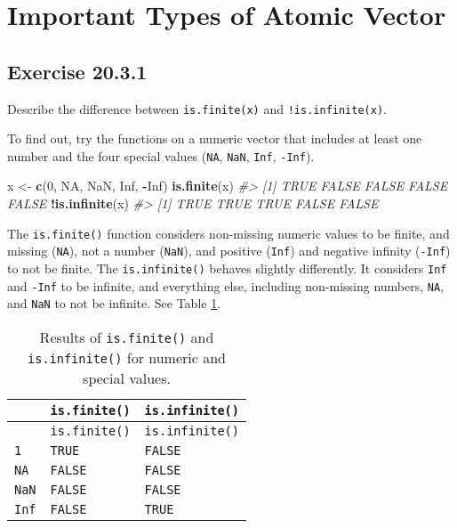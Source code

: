\documentclass[]{book}
\newenvironment{Shaded}{\begin{snugshade}}{\end{snugshade}}
\newcommand{\CommentTok}[1]{\textcolor[rgb]{0.56,0.35,0.01}{\textit{#1}}}
\newcommand{\DecValTok}[1]{\textcolor[rgb]{0.00,0.00,0.81}{#1}}
\newcommand{\KeywordTok}[1]{\textcolor[rgb]{0.13,0.29,0.53}{\textbf{#1}}}
\newcommand{\NormalTok}[1]{#1}
\newcommand{\OperatorTok}[1]{\textcolor[rgb]{0.81,0.36,0.00}{\textbf{#1}}}
\newcommand{\OtherTok}[1]{\textcolor[rgb]{0.56,0.35,0.01}{#1}}
\newcommand{\StringTok}[1]{\textcolor[rgb]{0.31,0.60,0.02}{#1}}
\theoremstyle{plain}
\theoremstyle{remark}
\begin{document}
\hypertarget{important-types-of-atomic-vector}{%
\section{Important Types of Atomic
Vector}\label{important-types-of-atomic-vector}}

\hypertarget{exercise-20.3.1}{%
\subsection*{\texorpdfstring{Exercise
{20.3.1}}{Exercise 20.3.1}}\label{exercise-20.3.1}}

Describe the difference between \texttt{is.finite(x)} and
\texttt{!is.infinite(x)}.

To find out, try the functions on a numeric vector that includes at
least one number and the four special values (\texttt{NA}, \texttt{NaN},
\texttt{Inf}, \texttt{-Inf}).

\begin{Shaded}
\begin{Highlighting}[]
\NormalTok{x <-}\StringTok{ }\KeywordTok{c}\NormalTok{(}\DecValTok{0}\NormalTok{, }\OtherTok{NA}\NormalTok{, }\OtherTok{NaN}\NormalTok{, }\OtherTok{Inf}\NormalTok{, }\OperatorTok{-}\OtherTok{Inf}\NormalTok{)}
\KeywordTok{is.finite}\NormalTok{(x)}
\CommentTok{#> [1]  TRUE FALSE FALSE FALSE FALSE}
\OperatorTok{!}\KeywordTok{is.infinite}\NormalTok{(x)}
\CommentTok{#> [1]  TRUE  TRUE  TRUE FALSE FALSE}
\end{Highlighting}
\end{Shaded}

The \texttt{is.finite()} function considers non-missing numeric values
to be finite, and missing (\texttt{NA}), not a number (\texttt{NaN}),
and positive (\texttt{Inf}) and negative infinity (\texttt{-Inf}) to not
be finite. The \texttt{is.infinite()} behaves slightly differently. It
considers \texttt{Inf} and \texttt{-Inf} to be infinite, and everything
else, including non-missing numbers, \texttt{NA}, and \texttt{NaN} to
not be infinite. See Table \ref{tab:finite-infinite}.

\begin{longtable}[]{@{}lll@{}}
\caption{\label{tab:finite-infinite} Results of \texttt{is.finite()} and
\texttt{is.infinite()} for numeric and special values.}\tabularnewline
\toprule
& \texttt{is.finite()} & \texttt{is.infinite()}\tabularnewline
\midrule
\endfirsthead
\toprule
& \texttt{is.finite()} & \texttt{is.infinite()}\tabularnewline
\midrule
\endhead
\texttt{1} & \texttt{TRUE} & \texttt{FALSE}\tabularnewline
\texttt{NA} & \texttt{FALSE} & \texttt{FALSE}\tabularnewline
\texttt{NaN} & \texttt{FALSE} & \texttt{FALSE}\tabularnewline
\texttt{Inf} & \texttt{FALSE} & \texttt{TRUE}\tabularnewline
\bottomrule
\end{longtable}
\end{document}
